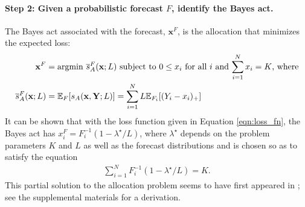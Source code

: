 \documentclass{article}
\def\elr#1{{\color{cyan}\textbf{ELR:[#1]}}}
\begin{document}
\paragraph{Step 2: Given a probabilistic forecast $F$, identify the Bayes act.} The Bayes act associated with the forecast, $\mathbf{x}^F$, is the allocation that minimizes the expected loss:
\begin{align}
    \mathbf{x}^F &= \mathrm{arg min}\,\, \overline{s}_A^F(\mathbf{x}; L) \text{ subject to }
    0 \leq x_i \text{ for all $i$ and} \, \sum_{i=1}^N x_i = K \text{, where} \label{AP} \\
    \overline{s}_A^F(\mathbf{x}; L) &= \mathbb{E}_{F} [s_A(\mathbf{x}, \mathbf{Y}; L)] = \sum_{i=1}^{N} L \mathbb{E}_{F_i}[(Y_i - x_i)_+] \label{eqn:sbar}
\end{align}
It can be shown that with the loss function given in Equation \eqref{eqn:loss_fn}, the Bayes act has $x^F_i = F_i^{-1}(1 - \lambda^{\star}/L)$, where $\lambda^{\star}$ depends on the problem parameters $K$ and $L$ as well as the forecast distributions and is chosen so as to satisfy the equation
\begin{align}
\sum_{i=1}^{N}F_i^{-1}(1 - \lambda^{\star}/L) = K.
\end{align}
This partial solution to the allocation problem seems to have first appeared in \cite{hadleywhitin1963}; see the supplemental materials for a derivation. %
\end{document}
